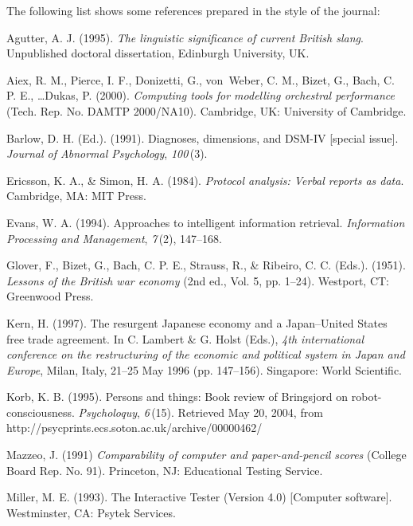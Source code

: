 \documentclass{nCSE2e}
\begin{document}
The following list shows some references prepared in the style of the journal:
%
\begin{thebibliography}{12}

Agutter, A. J. (1995). {\em{The linguistic significance of current
 British slang}}. Unpublished doctoral dissertation, Edinburgh
 University, UK.

Aiex, R. M., Pierce, I. F., Donizetti, G., {{v}on~Weber}, C. M., Bizet, G.,
 Bach, C. P. E., \ldots Dukas, P. (2000). {\em{Computing tools for
 modelling orchestral performance}} (Tech. Rep. No. DAMTP 2000/NA10).
 Cambridge, UK: University of Cambridge.

Barlow, D. H. (Ed.). (1991). Diagnoses, dimensions, and DSM-IV [special
 issue]. {\em{Journal of Abnormal Psychology}}, {\em{100}\,}(3).

Ericsson, K. A., \& Simon, H. A. (1984). {\em{Protocol analysis:
 Verbal reports as data}}. Cambridge, MA: MIT Press.

Evans, W. A. (1994). Approaches to intelligent information retrieval.
 {\em{Information Processing and Management}}, {\em{7\,}}(2), 147--168.

Glover, F., Bizet, G., Bach, C. P. E., Strauss, R., \& Ribeiro, C. C. (Eds.).
 (1951). {\em{Lessons of the British war economy}} (2nd ed., Vol. 5, pp. 1--24).
 Westport, CT: Greenwood Press.

Kern, H. (1997). The resurgent Japanese economy and a Japan--United
 States free trade agreement. In C. Lambert \& G. Holst (Eds.), {\em{4th
 international conference on the restructuring of the economic and
 political system in Japan and Europe}}, Milan, Italy, 21--25 May 1996 (pp.
 147--156). Singapore: World Scientific.

Korb, K. B. (1995). Persons and things: Book review of Bringsjord on
 robot-consciousness. {\em Psycholoquy}, {\em{6\,}}(15). Retrieved
 May 20, 2004, from http://psycprints.ecs.soton.ac.uk/archive/00000462/

Mazzeo, J. (1991) {\em{Comparability of computer and paper-and-pencil
 scores}} (College Board Rep. No. 91). Princeton, NJ: Educational
 Testing Service.

Miller, M. E. (1993). The Interactive Tester (Version 4.0) [Computer
 software]. Westminster, CA: Psytek Services.


\end{thebibliography}
\end{document}

